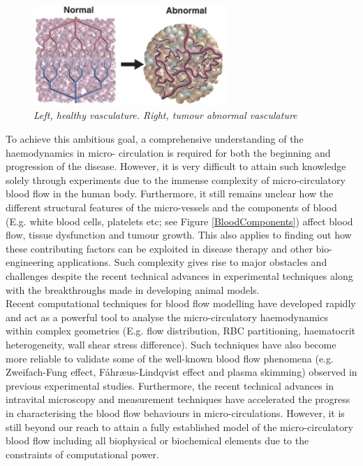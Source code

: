 \begin{figure}[H]
\centering
\includegraphics[width=0.65\textwidth]{images/BloodVessels.jpg}
\caption{\textit{Left, healthy vasculature. Right, tumour abnormal vasculature\cite{Jain58}} \label{BloodVessels}}
\end{figure}


\noindent To achieve this ambitious goal, a comprehensive understanding of the haemodynamics in micro- circulation is required for both the beginning and progression of the disease. However, it is very difficult to attain such knowledge solely through experiments due to the immense complexity of micro-circulatory blood flow in the human body. Furthermore, it still remains unclear how the different structural features of the micro-vessels and the components of blood (E.g. white blood cells, platelets etc; see Figure \ref{BloodComponents}) affect blood flow, tissue dysfunction and tumour growth. This also applies to finding out how these contributing factors can be exploited in disease therapy and other bio-engineering applications. Such complexity gives rise to major obstacles and challenges despite the recent technical advances in experimental techniques along with the breakthroughs made in developing animal models.\cite{PriesAR1994RtBF, Pries2000TheLayer, PRIES198981, Pries1992BloodHematocrit} \\

\noindent Recent computational techniques\cite{Noguchi14159, DoddiSaiK2009Tcmo, Freund2014, Balogh2018, 2020Charles} for blood flow modelling have developed rapidly and act as a powerful tool to analyse the micro-circulatory haemodynamics within complex geometries (E.g. flow distribution, RBC partitioning, haematocrit heterogeneity, wall shear stress difference). Such techniques have also become more reliable to validate some of the well-known blood flow phenomena (e.g. Zweifach-Fung effect, F{\aa}hr{\ae}us-Lindqvist effect and plasma skimming) observed in previous experimental studies. Furthermore, the recent technical advances in intravital microscopy and measurement techniques have accelerated the progress in characterising the blood flow behaviours in micro-circulations. However, it is still beyond our reach to attain a fully established model of the micro-circulatory blood flow including all biophysical or biochemical elements due to the constraints of computational power. \\


